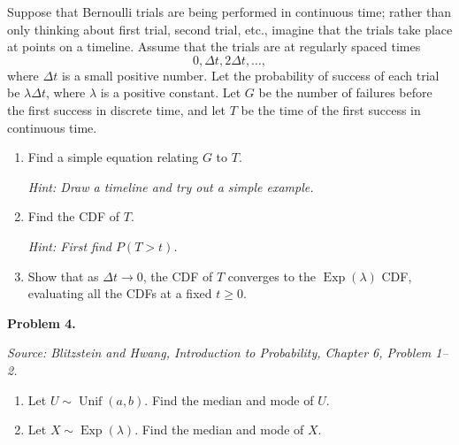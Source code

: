 \documentclass[11pt]{article}
\newcommand{\source}[2]{%
    \vspace{0.15cm}
    {\small\textit{Source: Blitzstein and Hwang, \textit{Introduction to Probability}, Chapter #1, Problem #2.}}
}
\begin{document}
Suppose that Bernoulli trials are being performed in continuous time; rather than only thinking about first trial, second trial, etc., imagine that the trials take place at points on a timeline. Assume that the trials are at regularly spaced times
\[
0,\Delta t,2\Delta t,\dots,
\]
where $\Delta t$ is a small positive number. Let the probability of success of each trial be $\lambda \Delta t$, where $\lambda$ is a positive constant. Let $G$ be the number of failures before the first success in discrete time, and let $T$ be the time of the first success in continuous time.

\begin{enumerate}[label=(\alph*), leftmargin=*]
    \item Find a simple equation relating $G$ to $T$.

    \emph{Hint: Draw a timeline and try out a simple example.}

    \item Find the CDF of $T$.

    \emph{Hint: First find $P(T>t)$.}

    \item Show that as $\Delta t\to0$, the CDF of $T$ converges to the $\operatorname{Exp}(\lambda)$ CDF, evaluating all the CDFs at a fixed $t\ge0$.

 
\end{enumerate}
 
\newpage


\begin{problemheader}
\textbf{Problem 4.}
\end{problemheader}
\source{6}{1--2}

\begin{enumerate}[label=(\alph*), leftmargin=*]
    \item Let $U\sim\operatorname{Unif}(a,b)$. Find the median and mode of $U$.

    \item Let $X\sim\operatorname{Exp}(\lambda)$. Find the median and mode of $X$.
\end{enumerate}
 
\newpage

 

 

 
\end{document}
